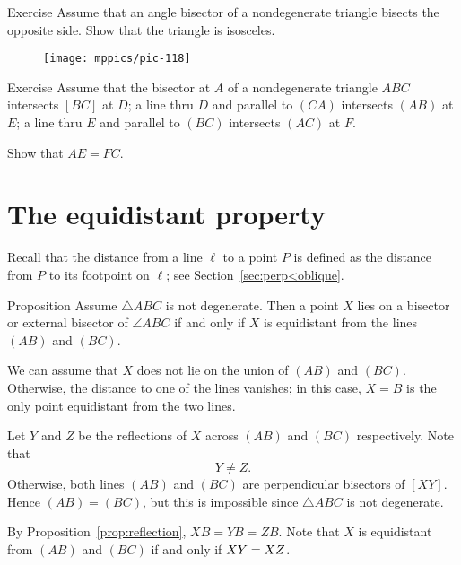 \begin{thm}{Exercise}\label{ex:bisect=median} 
Assume that an angle bisector of a nondegenerate triangle bisects the opposite side. 
Show that the triangle is isosceles.
\end{thm}

{

\begin{wrapfigure}{r}{38mm}
\vskip-5mm
\centering
\texttt{[image: mppics/pic-118]}
\end{wrapfigure}

\begin{thm}{Exercise}\label{ex:bisector-parallel} 
Assume that the bisector at $A$ of a nondegenerate triangle $ABC$ intersects $[BC]$ at $D$;
a line thru $D$ and parallel to $(CA)$ intersects $(AB)$ at $E$;
a line thru $E$ and parallel to $(BC)$ intersects $(AC)$ at $F$.

Show that 
$AE=FC$.

\end{thm}

}

\section{The equidistant property}

Recall that the distance from a line $\ell$ to a point $P$ is defined as the distance from $P$ to its footpoint on $\ell$; see Section~\ref{sec:perp<oblique}. 

\begin{thm}[\abs]{Proposition}\label{prop:angle-bisect-dist}
Assume $\triangle ABC$ is not degenerate.
Then a point $X$ lies on a bisector or external bisector of $\angle ABC$
if and only if $X$ is equidistant from the lines $(AB)$ and $(BC)$.
\end{thm}


We can assume that $X$ does not lie on the union of $(AB)$ and $(BC)$.
Otherwise, the distance to one of the lines vanishes;
in this case, $X=B$ is the only point equidistant from the two lines.

Let $Y$ and $Z$ be the reflections of $X$ across $(AB)$ and $(BC)$ respectively.
Note that 
\[Y\ne Z.\]
Otherwise, both lines $(AB)$ and $(BC)$ are perpendicular bisectors of $[XY]$.
Hence $(AB)=(BC)$, but this is impossible since $\triangle ABC$ is not degenerate.

By Proposition~\ref{prop:reflection}, $XB=YB=ZB$.
Note that $X$ is equidistant from $(AB)$ and $(BC)$ if and only if $XY=XZ$.


